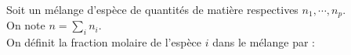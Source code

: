 ﻿\documentclass[a4paper]{article}
\begin{document}
\pagestyle{fancy}
\fancyhf{}
\setlength{\headheight}{15pt}

\begin{center}
	\large{}
\end{center}


Soit un mélange d'espèce de quantités de matière respectives \(n_1,\cdots,n_p\).\\
On note \(n=\sum\limits_in_i\).\\
On définit la fraction molaire de l'espèce \(i\) dans le mélange par :\begin{center}\end{center}
\end{document}
